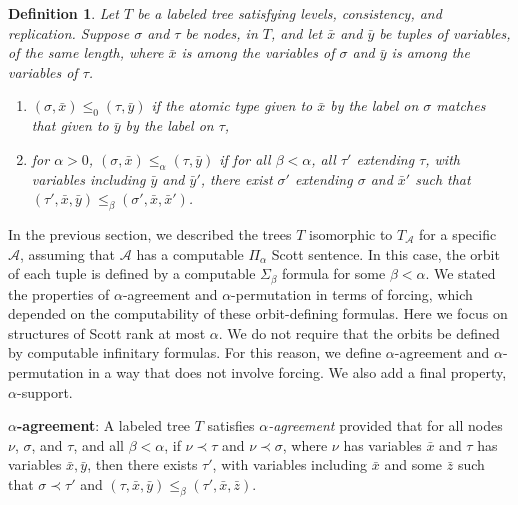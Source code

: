 \documentclass{article}
\newtheorem{defn}{Definition}
\begin{document}
\begin{defn}

Let $T$ be a labeled tree satisfying levels, consistency, and replication.  Suppose $\sigma$ and $\tau$ be nodes, in $T$, and let $\bar{x}$ and $\bar{y}$ be tuples of variables, of the same length, where $\bar{x}$ is among the variables of $\sigma$ and $\bar{y}$ is among the variables of $\tau$.      

\begin{enumerate}

\item  $(\sigma,\bar{x})\leq_0(\tau,\bar{y})$ if the atomic type given to $\bar{x}$ by the label on $\sigma$ matches that given to $\bar{y}$ by the label on $\tau$,

\item  for $\alpha > 0$, $(\sigma,\bar{x})\leq_\alpha(\tau,\bar{y})$ if for all $\beta < \alpha$, all $\tau'$ extending $\tau$, with variables including $\bar{y}$ and $\bar{y}'$, there exist $\sigma'$ extending $\sigma$ and $\bar{x}'$ such that $(\tau',\bar{x},\bar{y})\leq_\beta(\sigma',\bar{x},\bar{x}')$.

\end{enumerate} 

\end{defn} 
  
In the previous section, we described the trees $T$ isomorphic to $T_\mathcal{A}$ for a specific $\mathcal{A}$, assuming that $\mathcal{A}$ has a computable $\Pi_\alpha$ Scott sentence. In this case, the orbit of each tuple is defined by a computable $\Sigma_\beta$ formula for some $\beta < \alpha$.  We stated the properties of $\alpha$-agreement and $\alpha$-permutation in terms of forcing, which depended on the computability of these orbit-defining formulas.  Here we focus on structures of Scott rank at most $\alpha$.  We do not require that the orbits be defined by computable infinitary formulas.  For this reason, we define $\alpha$-agreement and $\alpha$-permutation in a way that does not involve forcing.  We also add a final property, $\alpha$-support.    

\bigskip
\noindent
\textbf{$\alpha$-agreement}:  A labeled tree $T$ satisfies \emph{$\alpha$-agreement} provided that for all nodes $\nu$, $\sigma$, and $\tau$, and all $\beta < \alpha$, if $\nu\prec\tau$ and $\nu\prec\sigma$, where $\nu$ has variables $\bar{x}$ and $\tau$ has variables $\bar{x},\bar{y}$, then there exists $\tau'$, with variables including $\bar{x}$ and some $\bar{z}$ such that $\sigma\prec\tau'$ and $(\tau,\bar{x},\bar{y})\leq_\beta(\tau',\bar{x},\bar{z})$.      
\end{document}
